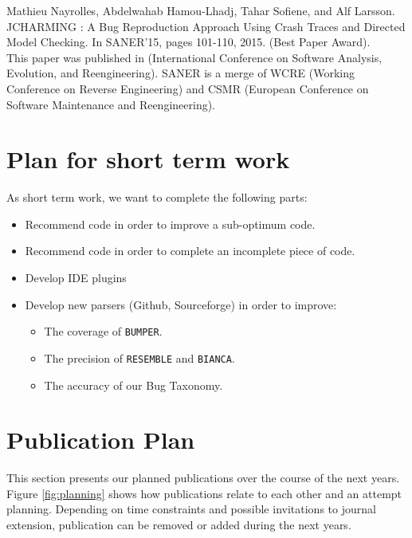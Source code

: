 \noindent Mathieu Nayrolles, Abdelwahab Hamou-Lhadj, Tahar Sofiene, and Alf Larsson. JCHARMING : A Bug Reproduction Approach Using Crash Traces and Directed Model Checking. In SANER’15, pages 101-110, 2015. (Best Paper Award).
\\ 

This paper was published in (International Conference on Software Analysis, Evolution, and Reengineering). SANER is a merge of WCRE (Working Conference on Reverse Engineering) and CSMR (European Conference on Software Maintenance and Reengineering). 


\section{Plan for short term work\label{sec:planning}}

As short term work, we want to complete the following parts:

\begin{itemize}
	\item Recommend code in order to improve a sub-optimum code.
	\item Recommend code in order to complete an incomplete piece of code.
	\item Develop IDE plugins
	\item Develop new parsers (Github, Sourceforge) in order to improve:
	\begin{itemize}
		\item The coverage of {\tt BUMPER}.
		\item The precision of {\tt RESEMBLE} and {\tt BIANCA}.
		\item The accuracy of our Bug Taxonomy.
	\end{itemize}
\end{itemize}

\section{Publication Plan\label{sec:publication-plan}}

This section presents our planned publications over the course of the next years. 
Figure \ref{fig:planning} shows how publications relate to each other and an attempt planning. 
Depending on time constraints and possible invitations to journal extension, publication can be removed or added during the next years.

